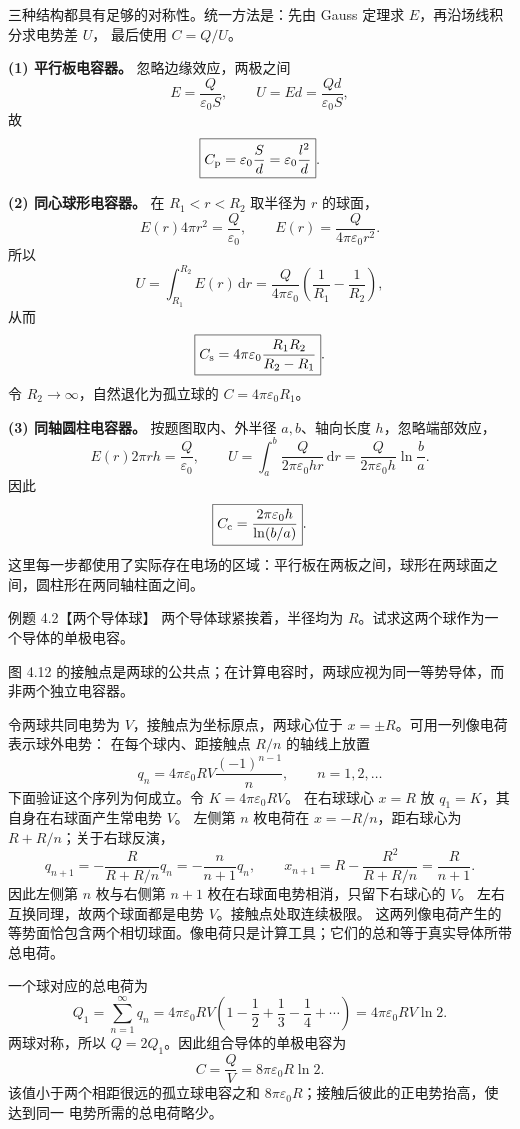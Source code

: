 \begin{xesolution}
三种结构都具有足够的对称性。统一方法是：先由 Gauss 定理求 $E$，再沿场线积分求电势差 $U$，
最后使用 $C=Q/U$。

\textbf{(1) 平行板电容器。} 忽略边缘效应，两极之间
\[
 E=\frac{Q}{\varepsilon_0S},\qquad U=Ed=\frac{Qd}{\varepsilon_0S},
\]
故
\[
 \boxed{C_{\rm p}=\varepsilon_0\frac Sd=\varepsilon_0\frac{l^2}{d}}.
\]

\textbf{(2) 同心球形电容器。} 在 $R_1<r<R_2$ 取半径为 $r$ 的球面，
\[
 E(r)4\pi r^2=\frac Q{\varepsilon_0},\qquad
 E(r)=\frac{Q}{4\pi\varepsilon_0r^2}.
\]
所以
\[
 U=\int_{R_1}^{R_2}E(r)\,\mathrm dr
 =\frac{Q}{4\pi\varepsilon_0}\left(\frac1{R_1}-\frac1{R_2}\right),
\]
从而
\[
 \boxed{C_{\rm s}=4\pi\varepsilon_0\frac{R_1R_2}{R_2-R_1}}.
\]
令 $R_2\to\infty$，自然退化为孤立球的 $C=4\pi\varepsilon_0R_1$。

\textbf{(3) 同轴圆柱电容器。} 按题图取内、外半径 $a,b$、轴向长度 $h$，忽略端部效应，
\[
 E(r)2\pi rh=\frac Q{\varepsilon_0},\qquad
 U=\int_{a}^{b}\frac{Q}{2\pi\varepsilon_0hr}\,\mathrm dr
 =\frac{Q}{2\pi\varepsilon_0h}\ln\frac{b}{a}.
\]
因此
\[
 \boxed{C_{\rm c}=\frac{2\pi\varepsilon_0h}{\ln(b/a)}}.
\]
这里每一步都使用了实际存在电场的区域：平行板在两板之间，球形在两球面之间，圆柱形在两同轴柱面之间。
\end{xesolution}

\begin{origexamplebox}{例题 4.2【两个导体球】}
两个导体球紧挨着，半径均为 $R$。试求这两个球作为一个导体的单极电容。
\touchingSpheresFigure
{}
\end{origexamplebox}

图 4.12 的接触点是两球的公共点；在计算电容时，两球应视为同一等势导体，而非两个独立电容器。



\begin{xesolution}
令两球共同电势为 $V$，接触点为坐标原点，两球心位于 $x=\pm R$。可用一列像电荷表示球外电势：
在每个球内、距接触点 $R/n$ 的轴线上放置
\[
 q_n=4\pi\varepsilon_0RV\frac{(-1)^{n-1}}n,
 \qquad n=1,2,\ldots
\]
下面验证这个序列为何成立。令 $K=4\pi\varepsilon_0RV$。
在右球球心 $x=R$ 放 $q_1=K$，其自身在右球面产生常电势 $V$。
左侧第 $n$ 枚电荷在 $x=-R/n$，距右球心为 $R+R/n$；关于右球反演，
\[
 q_{n+1}=-\frac{R}{R+R/n}q_n=-\frac n{n+1}q_n,\qquad
 x_{n+1}=R-\frac{R^2}{R+R/n}=\frac{R}{n+1}.
\]
因此左侧第 $n$ 枚与右侧第 $n+1$ 枚在右球面电势相消，只留下右球心的 $V$。
左右互换同理，故两个球面都是电势 $V$。接触点处取连续极限。
这两列像电荷产生的等势面恰包含两个相切球面。像电荷只是计算工具；它们的总和等于真实导体所带总电荷。

\touchingSphereImagesFigure
{}

一个球对应的总电荷为
\[
 Q_1=\sum_{n=1}^{\infty}q_n
 =4\pi\varepsilon_0RV\left(1-\frac12+\frac13-\frac14+\cdots\right)
 =4\pi\varepsilon_0RV\ln2.
\]
两球对称，所以 $Q=2Q_1$。因此组合导体的单极电容为
\[
 \boxed{C=\frac QV=8\pi\varepsilon_0R\ln2}.
\]
该值小于两个相距很远的孤立球电容之和 $8\pi\varepsilon_0R$；接触后彼此的正电势抬高，使达到同一
电势所需的总电荷略少。
\end{xesolution}

